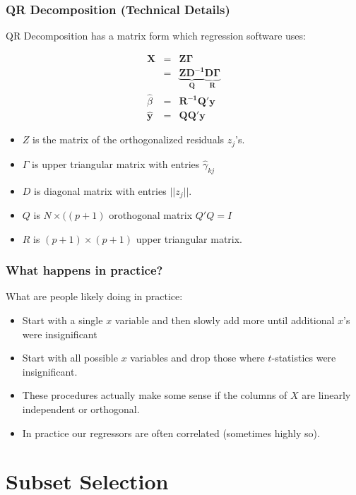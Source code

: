 \begin{frame}
\frametitle{QR Decomposition (Technical Details)}
QR Decomposition has a matrix form which regression software uses:

\begin{eqnarray*}
\mathbf{X} &=& \mathbf{Z \Gamma} \\
    &=& \mathbf{\underbrace{Z D^{-1}}_{Q} \underbrace{D \Gamma}_{R}} \\
    \hat{\beta} &=& \mathbf{R^{-1} Q' y}\\
    \hat{\mathbf{y}} &=& \mathbf{Q Q'} \mathbf{y}
\end{eqnarray*}
\begin{itemize}
\item $Z$ is the matrix of the orthogonalized residuals $z_j$'s.
\item $\Gamma$ is upper triangular matrix with entries $\hat{\gamma}_{kj}$
\item $D$ is diagonal matrix with entries $|| z_j ||$.
\item $Q$ is $N \times ((p+1)$ orothogonal matrix $Q'Q = I$ 
\item $R$ is $(p+1) \times (p+1)$ upper triangular matrix.
\end{itemize}
\end{frame}


\begin{frame}
\frametitle{What happens in practice?}
What are people likely doing in practice:
\begin{itemize}
\item Start with a single $x$ variable and then slowly add more until additional $x$'s were insignificant
\item Start with all possible $x$ variables and drop those where $t$-statistics were insignificant.
\item These procedures actually make some sense if the columns of $X$ are \alert{linearly independent} or \alert{orthogonal}.
\item In practice our regressors are often correlated (sometimes highly so).
\end{itemize}
\end{frame}
    

\section{Subset Selection}

